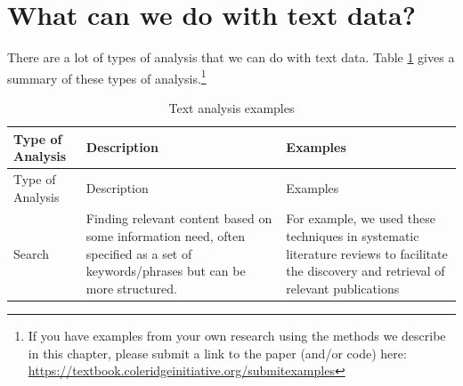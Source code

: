 \documentclass[]{krantz}
\begin{document}
\section{What can we do with text
data?}\label{what-can-we-do-with-text-data}

There are a lot of types of analysis that we can do with text data.
Table \ref{tab:table7-0} gives a summary of these types of
analysis.\footnote{If you have examples from your own research using the
  methods we describe in this chapter, please submit a link to the paper
  (and/or code) here:
  \url{https://textbook.coleridgeinitiative.org/submitexamples}}

\begin{longtable}[]{@{}lll@{}}
\caption{\label{tab:table7-0} Text analysis examples}\tabularnewline
\toprule
\begin{minipage}[b]{0.12\columnwidth}\raggedright\strut
Type of Analysis\strut
\end{minipage} & \begin{minipage}[b]{0.16\columnwidth}\raggedright\strut
Description\strut
\end{minipage} & \begin{minipage}[b]{0.63\columnwidth}\raggedright\strut
Examples\strut
\end{minipage}\tabularnewline
\midrule
\endfirsthead
\toprule
\begin{minipage}[b]{0.12\columnwidth}\raggedright\strut
Type of Analysis\strut
\end{minipage} & \begin{minipage}[b]{0.16\columnwidth}\raggedright\strut
Description\strut
\end{minipage} & \begin{minipage}[b]{0.63\columnwidth}\raggedright\strut
Examples\strut
\end{minipage}\tabularnewline
\midrule
\endhead
\begin{minipage}[t]{0.12\columnwidth}\raggedright\strut
Search\strut
\end{minipage} & \begin{minipage}[t]{0.16\columnwidth}\raggedright\strut
Finding relevant content based on some information need, often specified
as a set of keywords/phrases but can be more structured.\strut
\end{minipage} & \begin{minipage}[t]{0.63\columnwidth}\raggedright\strut
For example, we used these techniques in systematic literature reviews
to facilitate the discovery and retrieval of relevant publications

\end{minipage}
\end{longtable}
\end{document}
